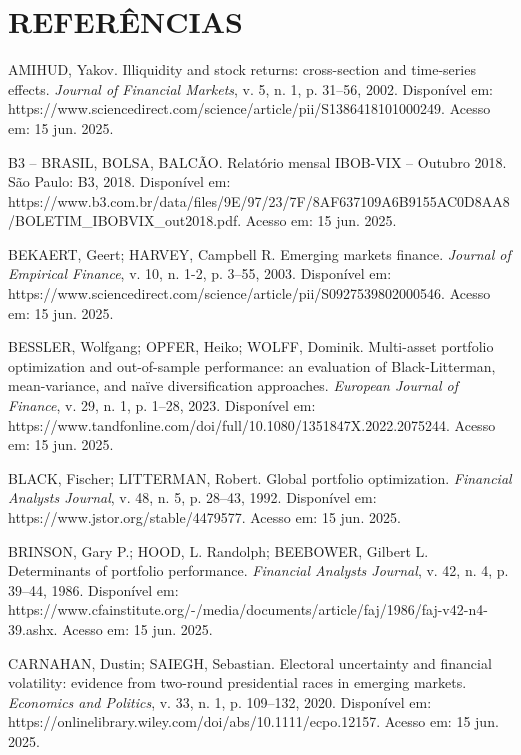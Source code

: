 \chapter*{REFERÊNCIAS}

\vspace{1cm}

\noindent
AMIHUD, Yakov. Illiquidity and stock returns: cross-section and time-series effects. \textit{Journal of Financial Markets}, v. 5, n. 1, p. 31--56, 2002. Disponível em: https://www.sciencedirect.com/science/article/pii/S1386418101000249. Acesso em: 15 jun. 2025.

\noindent
B3 -- BRASIL, BOLSA, BALCÃO. Relatório mensal IBOB-VIX -- Outubro 2018. São Paulo: B3, 2018. Disponível em: https://www.b3.com.br/data/files/9E/97/23/7F/8AF637109A6B9155AC0D8AA8/BOLETIM\_IBOBVIX\_out2018.pdf. Acesso em: 15 jun. 2025.

\noindent
BEKAERT, Geert; HARVEY, Campbell R. Emerging markets finance. \textit{Journal of Empirical Finance}, v. 10, n. 1-2, p. 3--55, 2003. Disponível em: https://www.sciencedirect.com/science/article/pii/S0927539802000546. Acesso em: 15 jun. 2025.

\noindent
BESSLER, Wolfgang; OPFER, Heiko; WOLFF, Dominik. Multi-asset portfolio optimization and out-of-sample performance: an evaluation of Black-Litterman, mean-variance, and naïve diversification approaches. \textit{European Journal of Finance}, v. 29, n. 1, p. 1--28, 2023. Disponível em: https://www.tandfonline.com/doi/full/10.1080/1351847X.2022.2075244. Acesso em: 15 jun. 2025.

\noindent
BLACK, Fischer; LITTERMAN, Robert. Global portfolio optimization. \textit{Financial Analysts Journal}, v. 48, n. 5, p. 28--43, 1992. Disponível em: https://www.jstor.org/stable/4479577. Acesso em: 15 jun. 2025.

\noindent
BRINSON, Gary P.; HOOD, L. Randolph; BEEBOWER, Gilbert L. Determinants of portfolio performance. \textit{Financial Analysts Journal}, v. 42, n. 4, p. 39--44, 1986. Disponível em: https://www.cfainstitute.org/-/media/documents/article/faj/1986/faj-v42-n4-39.ashx. Acesso em: 15 jun. 2025.

\noindent
CARNAHAN, Dustin; SAIEGH, Sebastian. Electoral uncertainty and financial volatility: evidence from two-round presidential races in emerging markets. \textit{Economics and Politics}, v. 33, n. 1, p. 109--132, 2020. Disponível em: https://onlinelibrary.wiley.com/doi/abs/10.1111/ecpo.12157. Acesso em: 15 jun. 2025.

